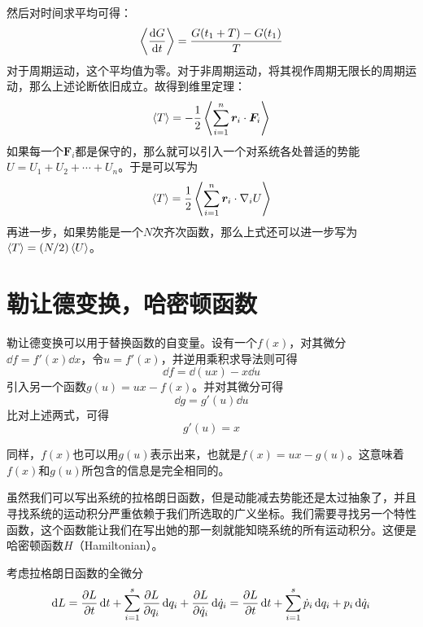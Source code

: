         然后对时间求平均可得：
        \begin{equation}
            \left\langle\dv{G}{t}\right\rangle = \frac{G(t_1+T)-G(t_1)}{T}
        \end{equation}
        对于周期运动，这个平均值为零。对于非周期运动，将其视作周期无限长的周期运动，那么上述论断依旧成立。故得到维里定理：
        \begin{equation}
            \label{eq:维里定理}
            \left\langle T\right\rangle=-\frac{1}{2}\left\langle\sum_{i=1}^{n}\bm{r}_i\cdot\bm{F}_i\right\rangle
        \end{equation}
        如果每一个$\bm{F}_i$都是保守的，那么就可以引入一个对系统各处普适的势能$U=U_1+U_2+\cdots+U_n$。于是可以写为
        \begin{equation}
            \label{eq:维里定理2}
            \left\langle T\right\rangle=\frac{1}{2}\left\langle\sum_{i=1}^{n}\bm{r}_i\cdot\nabla_iU\right\rangle
        \end{equation}
        再进一步，如果势能是一个$N$次齐次函数，那么上式还可以进一步写为$\left\langle T\right\rangle=(N/2)\left\langle U\right\rangle$。

        \section{勒让德变换，哈密顿函数}
        勒让德变换可以用于替换函数的自变量。设有一个$f(x)$，对其微分$\dd{f}=f'(x)\dd{x}$，令$u=f'(x)$，并逆用乘积求导法则可得
        \begin{equation}
            \dd{f}=\dd{(ux)}-x\dd{u}
        \end{equation}
        引入另一个函数$g(u)=ux-f(x)$。并对其微分可得
        \begin{equation}
            \dd{g}=g'(u)\dd{u}
        \end{equation}
        比对上述两式，可得
        \begin{equation}
            g'(u)=x
        \end{equation}

        同样，$f(x)$也可以用$g(u)$表示出来，也就是$f(x)=ux-g(u)$。这意味着$f(x)$和$g(u)$所包含的信息是完全相同的。

        虽然我们可以写出系统的拉格朗日函数，但是动能减去势能还是太过抽象了，并且寻找系统的运动积分严重依赖于我们所选取的广义坐标。我们需要寻找另一个特性函数，这个函数能让我们在写出她的那一刻就能知晓系统的所有运动积分。这便是哈密顿函数$H$（Hamiltonian）。

        考虑拉格朗日函数的全微分
        \begin{equation}
            \dd{L}=\pdv{L}{t}\dd{t} + \sum_{i=1}^{s}\pdv{L}{q_i}\dd{q_i}+\pdv{L}{\dot{q}_i}\dd{\dot{q}_i}=\pdv{L}{t}\dd{t} + \sum_{i=1}^{s}\dot{p}_i\dd{q_i}+p_i\dd{\dot{q}_i}
        \end{equation}
        
